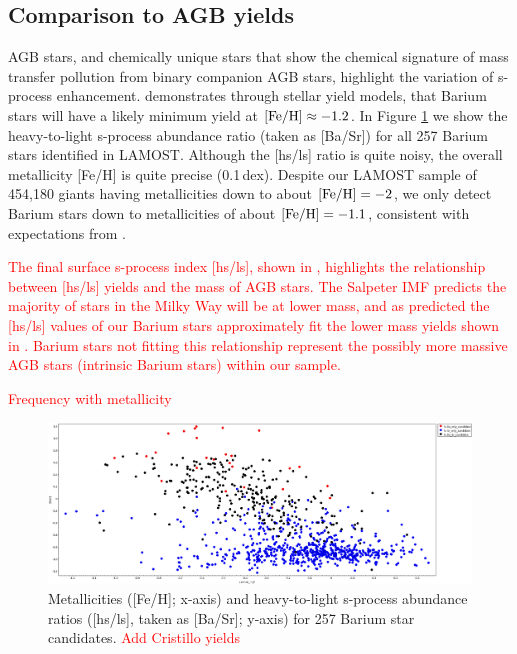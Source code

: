 \documentclass[a4paper,fleqn,usenatbib]{mnras}
\newcommand{\todo}[1]{\textcolor{red}{#1}}
\begin{document}
\subsection{Comparison to AGB yields}
AGB stars, and chemically unique stars that show the chemical signature
of mass transfer pollution from binary companion AGB stars, highlight the variation of s-process enhancement. \citet{karakas_lugaro2016} demonstrates through stellar yield models, that Barium stars will have a likely minimum yield at $[{\rm Fe/H}] \approx -1.2$. In Figure \ref{fig:figure3} we show the heavy-to-light s-process abundance ratio (taken as [Ba/Sr]) for all 257 Barium stars identified in LAMOST. Although the [hs/ls] ratio is quite noisy, the overall metallicity [Fe/H] is quite precise (0.1\,dex). Despite our LAMOST sample of 454,180 giants having metallicities down to about $[{\rm Fe/H}] = -2$, we only detect Barium stars down to metallicities of about $[{\rm Fe/H}] = -1.1$, consistent with expectations from \citep{karakas_lugaro2016}.



\todo{The final surface s-process index [hs/ls], shown in \citet{cristallo2015}, highlights the relationship between [hs/ls] yields and the mass of AGB stars. The Salpeter IMF predicts the majority of stars in the Milky Way will be at lower mass, and as predicted the [hs/ls] values of our Barium stars approximately fit the lower mass yields shown in \citet{cristallo2015}. Barium stars not fitting this relationship represent the possibly more massive AGB stars (intrinsic Barium stars) within our sample. }

\todo{Frequency with metallicity}

\begin{figure}
	\includegraphics[width=\columnwidth]{basrtest4.png}
    \caption{Metallicities ([Fe/H]; x-axis) and heavy-to-light s-process abundance ratios ([hs/ls], taken as [Ba/Sr]; y-axis) for 257 Barium star candidates. \todo{Add Cristillo yields}}
    \label{fig:figure3}
\end{figure}
\end{document}
